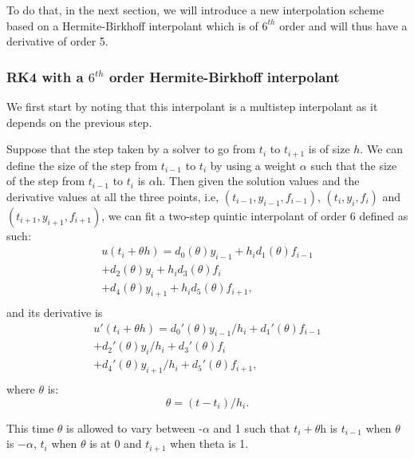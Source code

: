 \documentclass{article}
\begin{document}
To do that, in the next section, we will introduce a new interpolation scheme based on a Hermite-Birkhoff interpolant which is of $6^{th}$ order and will thus have a derivative of order 5.

\subsubsection{RK4 with a $6^{th}$ order Hermite-Birkhoff interpolant}
We first start by noting that this interpolant is a multistep interpolant as it depends on the previous step.

Suppose that the step taken by a solver to go from $t_i$ to $t_{i + 1}$ is of size $h$. We can define the size of the step from $t_{i - 1}$ to $t_i$ by using a weight $\alpha$ such that the size of the step from $t_{i - 1}$ to $t_i$ is $\alpha$h. Then given the solution values and the derivative values at all the three points, i.e, $(t_{i-1}, y_{i - 1}, f_{i - 1})$, $(t_i, y_i, f_i)$ and $(t_{i + 1}, y_{i + 1}, f_{i + 1})$, we can fit a two-step quintic interpolant of order 6 defined as such:
\begin{equation}
\begin{split}
u(t_i + \theta h) = d_{0}(\theta) y_{i-1} +  h_id_{1}(\theta)f_{i-1} \\
+ d_{2}(\theta)y_i     +  h_id_{3}(\theta)f_i \\
+ d_{4}(\theta)y_{i + 1} + h_id_{5}(\theta)f_{i + 1}, \\
\end{split}
\end{equation}
and its derivative is
\begin{equation}
\begin{split}
u'(t_i + \theta h) = d_{0}'(\theta)y_{i-1}/h_i +  d_{1}'(\theta)f_{i-1} \\
+ d_{2}'(\theta)y_i/h_i     +  d_{3}'(\theta)f_i \\
+ d_{4}'(\theta)y_{i + 1}/h_i + d_{5}'(\theta)f_{i + 1}, \\
\end{split}
\end{equation}
where $\theta$ is:
\begin{equation}
\theta = (t - t_i) / h_i.
\end{equation}

This time $\theta$ is allowed to vary between -$\alpha$ and 1 such that $t_i + \theta$h is $t_{i - 1}$ when $\theta$ is $-\alpha$, $t_i$ when $\theta$ is at 0 and $t_{i + 1}$ when theta is 1.
\end{document}
